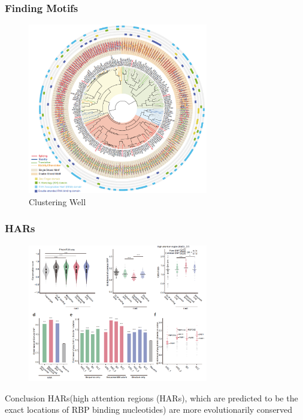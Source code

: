 \documentclass{ctexbeamer}
\begin{document}
\begin{frame}
  \frametitle{Finding Motifs}
  \begin{figure}[H]
    \center
    \includegraphics[width=0.7\textwidth]{./figures/motif2.png}
    \caption{Clustering Well}
    \label{fig:motif2}
  \end{figure}
\end{frame}

\begin{frame}
  \frametitle{HARs}
  \begin{figure}[H]
    \center
    \includegraphics[width=0.7\textwidth]{./figures/har.png}
    \label{fig:har}
  \end{figure}
    \begin{block}{Conclusion}
    HARs(high attention regions (HARs), which are predicted to be the
exact locations of RBP binding nucleotides) are more evolutionarily conserved
  \end{block}
\end{frame}
\end{document}
